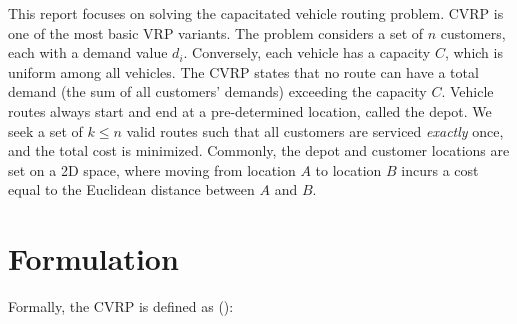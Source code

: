 \documentclass[12pt]{report}
\begin{document}
This report focuses on solving the capacitated vehicle routing problem. CVRP is one of the most basic VRP variants. The problem considers a set of $n$ customers, each with a demand value $d_i$. Conversely, each vehicle has a capacity $C$, which is uniform among all vehicles. The CVRP states that no route can have a total demand (the sum of all customers' demands) exceeding the capacity $C$. Vehicle routes always start and end at a pre-determined location, called the depot. We seek a set of $k \leq n$ valid routes such that all customers are serviced \textit{exactly} once, and the total cost is minimized. Commonly, the depot and customer locations are set on a 2D space, where moving from location $A$ to location $B$ incurs a cost equal to the Euclidean distance between $A$ and $B$.



\section{Formulation}
Formally, the CVRP is defined as (\cite{borcinova2017two}):
\end{document}
